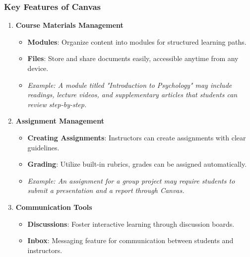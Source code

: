 \documentclass[aspectratio=169]{beamer}
\begin{document}
\begin{frame}[fragile]
    \frametitle{Key Features of Canvas}
    \begin{enumerate}
        \item \textbf{Course Materials Management}
        \begin{itemize}
            \item \textbf{Modules}: Organize content into modules for structured learning paths.
            \item \textbf{Files}: Store and share documents easily, accessible anytime from any device.
            \item \textit{Example: A module titled "Introduction to Psychology" may include readings, lecture videos, and supplementary articles that students can review step-by-step.}
        \end{itemize}
        
        \item \textbf{Assignment Management}
        \begin{itemize}
            \item \textbf{Creating Assignments}: Instructors can create assignments with clear guidelines.
            \item \textbf{Grading}: Utilize built-in rubrics, grades can be assigned automatically.
            \item \textit{Example: An assignment for a group project may require students to submit a presentation and a report through Canvas.}
        \end{itemize}
        
        \item \textbf{Communication Tools}
        \begin{itemize}
            \item \textbf{Discussions}: Foster interactive learning through discussion boards.
            \item \textbf{Inbox}: Messaging feature for communication between students and instructors.
        \end{itemize}
    \end{enumerate}
\end{frame}
\end{document}

